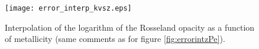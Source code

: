 \documentclass[11pt]{article}
\begin{document}
\begin{figure}[h!]
\begin{center}            
\texttt{[image: error\_interp\_kvsz.eps]}
\caption{Interpolation of the logarithm of the Rosseland opacity as a function of metallicity (same comments as for figure \ref{fig:errorintzPe}).}\label{fig:errorintzk}
\end{center}
\end{figure}
\end{document}
